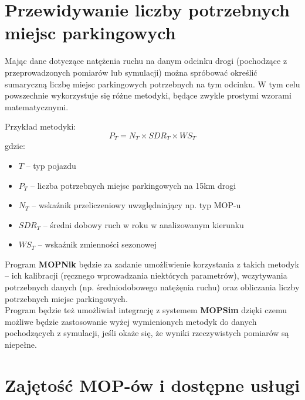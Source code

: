 \section{Przewidywanie liczby potrzebnych miejsc parkingowych}
Mając dane dotyczące natężenia ruchu na danym odcinku drogi (pochodzące z
przeprowadzonych pomiarów lub symulacji) można spróbować określić sumaryczną
liczbę miejsc parkingowych potrzebnych na tym odcinku. W tym celu powszechnie
wykorzystuje się różne metodyki, będące zwykle prostymi wzorami matematycznymi.

Przykład metodyki: 
$$ P_T = N_T \times SDR_T \times WS_T $$
gdzie:
\begin{itemize}
  \item $T$ -- typ pojazdu
  \item $P_T$ -- liczba potrzebnych miejsc parkingowych na 15km drogi
  \item $N_T$ -- wskaźnik przeliczeniowy uwzględniający np. typ MOP-u
  \item $SDR_T$ -- średni dobowy ruch w roku w analizowanym kierunku 
  \item $WS_T$ -- wskaźnik zmienności sezonowej
\end{itemize}
Program \textbf{MOPNik} będzie za zadanie umożliwienie korzystania z
takich metodyk -- ich kalibracji (ręcznego wprowadzania niektórych parametrów),
wczytywania potrzebnych danych (np. średniodobowego natężęnia ruchu)
oraz obliczania liczby potrzebnych miejsc parkingowych. \\
Program będzie też umożliwiał integrację z systemem \textbf{MOPSim} dzięki
czemu możliwe będzie zastosowanie wyżej wymienionych metodyk do danych
pochodzących z symulacji, jeśli okaże się, że wyniki rzeczywistych pomiarów są
niepełne. 


\section{Zajętość MOP-ów i dostępne usługi}

